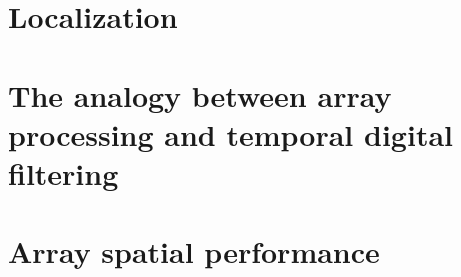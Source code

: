 \section{Localization}
\label{sec:prlm_localization}

% 
\section{The analogy between array processing and temporal digital filtering}
\label{sec:prlm_FIR_IIR}

\section{Array spatial performance}
\label{sec:prlm_array_perf}
